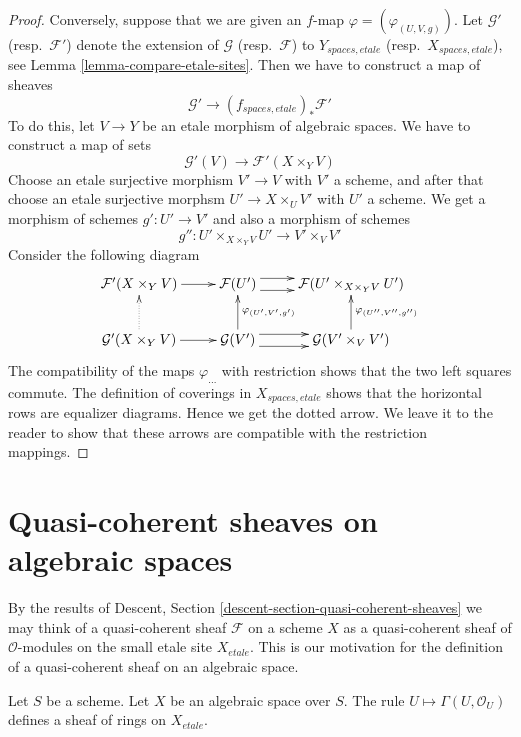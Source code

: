 \begin{proof}
\medskip\noindent
Conversely, suppose that we are given an $f$-map
$\varphi = (\varphi_{(U, V, g)})$.
Let $\mathcal{G}'$ (resp.\ $\mathcal{F}'$) denote the extension of
$\mathcal{G}$ (resp.\ $\mathcal{F}$) to $Y_{spaces, etale}$
(resp.\ $X_{spaces, etale}$), see Lemma \ref{lemma-compare-etale-sites}.
Then we have to construct a map of sheaves
$$
\mathcal{G}' \longrightarrow (f_{spaces, etale})_*\mathcal{F}'
$$
To do this, let $V \to Y$ be an etale morphism of algebraic spaces.
We have to construct a map of sets
$$
\mathcal{G}'(V) \to \mathcal{F}'(X \times_Y V)
$$
Choose an etale surjective morphism $V' \to V$ with $V'$ a scheme,
and after that choose an etale surjective morphsm
$U' \to X \times_U V'$ with $U'$ a scheme. We get a morphism of
schemes $g' : U' \to V'$ and also a morphism of schemes
$$
g'' : U' \times_{X \times_Y V} U' \longrightarrow V' \times_V V'
$$
Consider the following diagram
$$
\xymatrix{
\mathcal{F}'(X \times_Y V) \ar[r] &
\mathcal{F}(U') \ar@<1ex>[r] \ar@<-1ex>[r] &
\mathcal{F}(U' \times_{X \times_Y V} U') \\
\mathcal{G}'(X \times_Y V) \ar[r] \ar@{..>}[u] &
\mathcal{G}(V') \ar@<1ex>[r] \ar@<-1ex>[r] \ar[u]_{\varphi_{(U', V', g')}} &
\mathcal{G}(V' \times_V V') \ar[u]_{\varphi_{(U'', V'', g'')}}
}
$$
The compatibility of the maps $\varphi_{...}$
with restriction shows that the two left squares commute.
The definition of coverings in $X_{spaces, etale}$ shows that
the horizontal rows are equalizer diagrams. Hence we get
the dotted arrow. We leave it to the reader to show that these
arrows are compatible with the restriction mappings.
\end{proof}







\section{Quasi-coherent sheaves on algebraic spaces}
\label{section-quasi-coherent}

\noindent
By the results of
Descent, Section \ref{descent-section-quasi-coherent-sheaves}
we may think of a quasi-coherent sheaf $\mathcal{F}$ on a scheme
$X$ as a quasi-coherent sheaf of $\mathcal{O}$-modules on the small
etale site $X_{etale}$. This is our motivation for the definition of
a quasi-coherent sheaf on an algebraic space.

\begin{lemma}
\label{lemma-sheaf-condition-holds}
Let $S$ be a scheme. Let $X$ be an algebraic space over $S$.
The rule $U \mapsto \Gamma(U, \mathcal{O}_U)$ defines
a sheaf of rings on $X_{etale}$.
\end{lemma}


